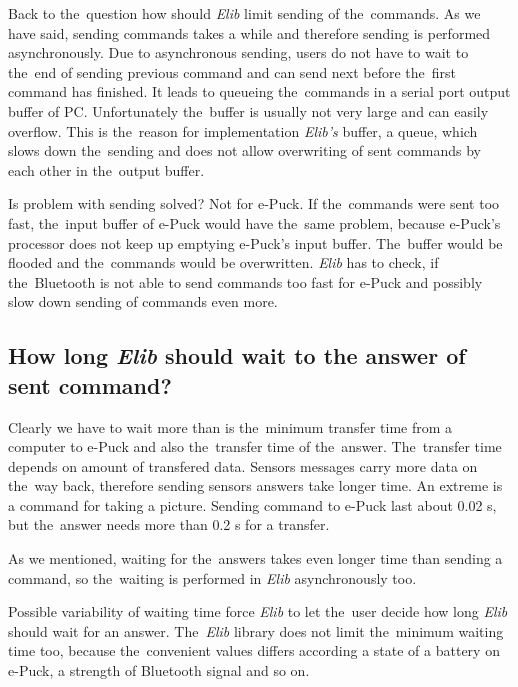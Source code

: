   Back to the~question how should {\it Elib} limit sending of the~commands.
  As we have said, sending commands takes a while and therefore sending is performed asynchronously. 
  Due to asynchronous sending, users do not have to wait to the~end of sending previous command and
  can send next before the~first command has finished.
  It leads to queueing the~commands in a serial port output buffer of PC. Unfortunately the~buffer is usually not 
  very large and can easily overflow. 
  This is the~reason for implementation {\it Elib's} buffer, a queue, which slows down the~sending and does not allow
  overwriting of sent commands by each other in the~output buffer. 
   
  Is problem with sending solved? Not for e-Puck. If the~commands were sent too fast,
  the~input buffer of e-Puck would have the~same problem, because e-Puck's processor does not keep up emptying e-Puck's
  input buffer. The~buffer would be flooded and the~commands would be overwritten. 
  {\it Elib} has to check, if the~Bluetooth is not able to send commands too fast for e-Puck
  and possibly slow down sending of commands even more.

  \subsection*{How long {\it Elib} should wait to the answer of sent command?} 
  Clearly we have to wait more than is the~minimum transfer time from a computer to e-Puck and also
  the~transfer time of the~answer.
  The~transfer time depends on  amount of transfered data. 
  Sensors messages carry more data on the~way back, therefore sending sensors answers take longer time.
  An extreme is a command for taking a picture. Sending command to e-Puck last about 0.02 s, but
  the~answer needs more than 0.2 s for a transfer.
   
  As we mentioned, waiting for the~answers takes even longer time than sending a command,
  so the~waiting is performed in {\it Elib} asynchronously too.
   
  Possible variability of waiting time force {\it Elib} to let the~user decide how long
   {\it Elib} should wait for an answer. The~{\it Elib} library does not limit the~minimum waiting time too,
  because the~convenient values differs according a state of a battery on e-Puck, a strength of Bluetooth signal
  and so on. 
  
